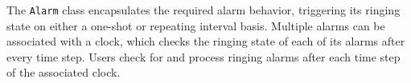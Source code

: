 
\label{sec:Alarm}
The {\tt Alarm} class encapsulates the required alarm behavior, triggering
its ringing state on either a one-shot or repeating interval basis.  Multiple
alarms can be associated with a clock, which checks the ringing state of each
of its alarms after every time step. Users check for and process ringing
alarms after each time step of the associated clock.
